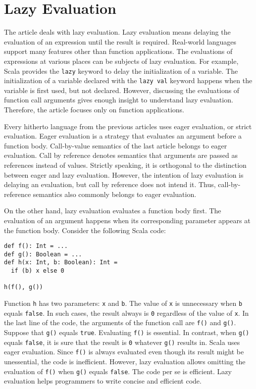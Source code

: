 \setchapterpreamble[u]{\margintoc}
\chapter{Lazy Evaluation}

The article deals with lazy evaluation. Lazy evaluation means delaying the
evaluation of an expression until the result is required. Real-world languages
support many features other than function applications. The evaluations of
expressions at various places can be subjects of lazy evaluation. For example,
Scala provides the \verb!lazy! keyword to delay the initialization of a variable.
The initialization of a variable declared with the \verb!lazy val! keyword
happens when the variable is first used, but not declared. However, discussing
the evaluations of function call arguments gives enough insight to understand
lazy evaluation. Therefore, the article focuses only on function applications.

Every hitherto language from the previous articles uses eager evaluation, or
strict evaluation. Eager evaluation is a strategy that evaluates an argument
before a function body. Call-by-value semantics of the last article belongs to
eager evaluation. Call by reference denotes semantics that arguments are passed
as references instead of values. Strictly speaking, it is orthogonal to the
distinction between eager and lazy evaluation. However, the intention of lazy
evaluation is delaying an evaluation, but call by reference does not intend it.
Thus, call-by-reference semantics also commonly belongs to eager evaluation.

On the other hand, lazy evaluation evaluates a function body first. The
evaluation of an argument happens when its corresponding parameter appears at the
function body. Consider the following Scala code:

\begin{verbatim}
def f(): Int = ...
def g(): Boolean = ...
def h(x: Int, b: Boolean): Int =
  if (b) x else 0

h(f(), g())
\end{verbatim}

Function \verb!h! has two parameters: \verb!x! and \verb!b!. The value of
\verb!x! is unnecessary when \verb!b! equals \verb!false!. In such cases, the
result always is \verb!0! regardless of the value of \verb!x!. In the last line
of the code, the arguments of the function call are \verb!f()! and \verb!g()!.
Suppose that \verb!g()! equals \verb!true!. Evaluating \verb!f()! is essential.
In contrast, when \verb!g()! equals \verb!false!, it is sure that the result is
\verb!0! whatever \verb!g()! results in. Scala uses eager evaluation. Since
\verb!f()! is always evaluated even though its result might be unessential, the
code is inefficient. However, lazy evaluation allows omitting the evaluation of
\verb!f()! when \verb!g()! equals \verb!false!. The code per se is efficient.
Lazy evaluation helps programmers to write concise and efficient code.


